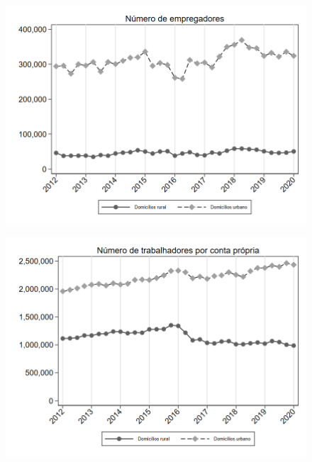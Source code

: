 \begin{frame}[label=_composicao_demografica_rural_urbano_n_empregador]{}
\textit{\hyperlink{_composicao_demografica_rural_urbano}{}}
\begin{figure}
  \centering
  \includegraphics[width=1.0\linewidth]{../../analysis/output/composicao_demografica/area_geografica/_composicao_demografica_rural_urbano_n_empregador.png}
  \caption{}
  \label{fig:_composicao_demografica_rural_urbano_n_empregador}
\end{figure}
\end{frame}



\begin{frame}[label=_composicao_demografica_rural_urbano_n_cpropria]{}
\textit{\hyperlink{_composicao_demografica_rural_urbano}{}}
\begin{figure}
  \centering
  \includegraphics[width=1.0\linewidth]{../../analysis/output/composicao_demografica/area_geografica/_composicao_demografica_rural_urbano_n_cpropria.png}
  \caption{}
  \label{fig:_composicao_demografica_rural_urbano_n_cpropria}
\end{figure}
\end{frame}

